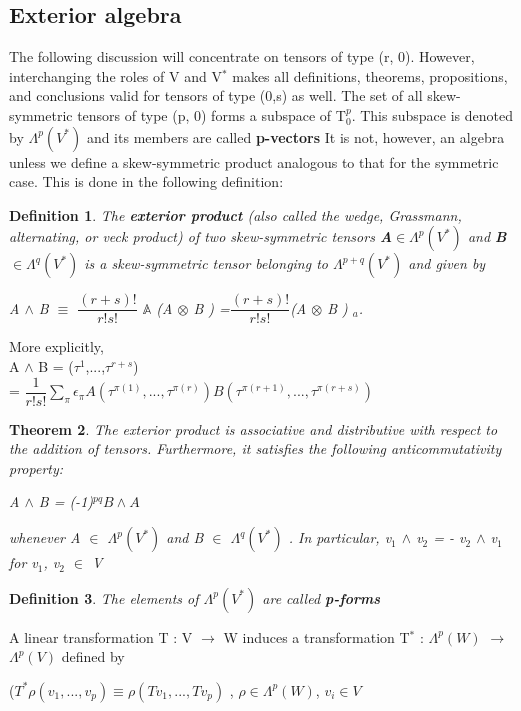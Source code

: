\documentclass[12pt,a4paper]{article}
\newtheorem{thm}{Theorem}
\newtheorem{defn}[thm]{Definition}
\begin{document}
\subsection{Exterior algebra}
The following discussion will concentrate on tensors of type (r, 0). However, interchanging the roles of V and V$^*$ makes all definitions, theorems,
propositions, and conclusions valid for tensors of type (0,s) as well. The set of all skew-symmetric tensors of type (p, 0) forms a subspace of T$^{p}_{0}$. This subspace is denoted by $\Lambda^{p}  (V^*)$ and its members are called \textbf{p-vectors} It is not, however, an algebra unless we define a skew-symmetric
product analogous to that for the symmetric case. This is done in the following definition:
\begin{defn}
The \textbf{exterior product} (also called the wedge, Grassmann, alternating, or veck product) of two skew-symmetric tensors \textbf{A}$\in\Lambda^{p}(V^*)$ and  \textbf{B}$\in\Lambda^{q}(V^*)$ is a skew-symmetric tensor belonging to $\Lambda^{p+q}(V^*)$ and given by
\begin{center}
A $\wedge$ B $\equiv$ $\dfrac{(r+s)!}{r!s!}$ $\mathbb{A}$ (A $\otimes$ B ) =$\dfrac{(r+s)!}{r!s!}$(A $\otimes$ B ) $_{a}$.
\end{center}
\end{defn}

More explicitly,\\
A $\wedge$ B = ($\tau^1$,...,$\tau^{r+s}$)\\	
= $\dfrac{1}{r!s!}\sum_{\pi}\epsilon_{\pi} A (\tau^{\pi(1)},...,\tau^{\pi(r)})B (\tau^{\pi(r+1)},...,\tau^{\pi(r+s)})$

\begin{thm}
The exterior product is associative and distributive
with respect to the addition of tensors. Furthermore, it satisfies the
following anticommutativity property:
\begin{center}
A $\wedge$ B = (-1)$^{pq}B\wedge A$
\end{center}
whenever A $\in$ $\Lambda^{p} (V^*)$ and B $\in$ $\Lambda^{q} (V^*)$ .  In particular, v$_1$ $\wedge$ v$_2$ =
   - v$_2$ $\wedge$ v$_1$ for v$_1$, v$_2$ $\in$ V
\end{thm}
\begin{defn}
The elements of $\Lambda^{p} (V^*)$ are called \textbf{p-forms} 
\end{defn}
A linear transformation T : V $\to$ W induces a transformation T$^*$ : $\Lambda^{p} (W)$  $\to$ $\Lambda^{p} (V)$ defined by
\begin{center}
($T^{*} \rho (v_1,...,v_p) \equiv \rho (T v_1,...,T v_p)$ , $\rho \in \Lambda^{p}(W)$, $v_i \in V$
\end{center}
\end{document}
